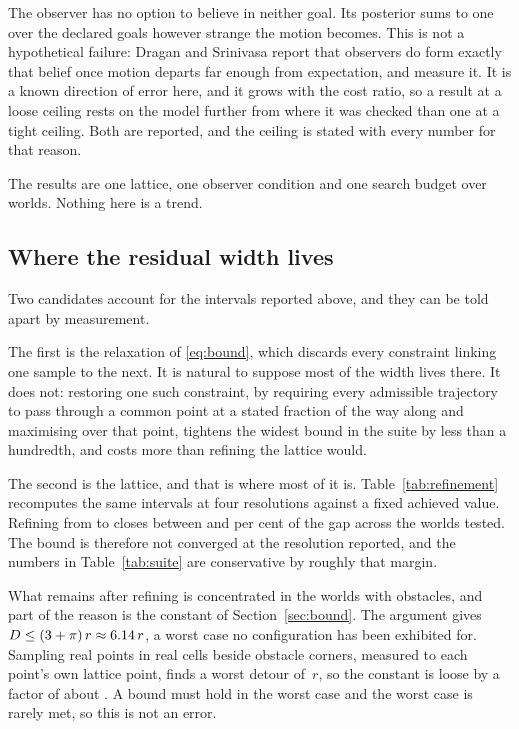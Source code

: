 \documentclass[journal]{IEEEtran}
\begin{document}
The observer has no option to believe in neither goal. Its posterior sums to
one over the declared goals however strange the motion becomes. This is not a
hypothetical failure: Dragan and Srinivasa \cite{dragan2013generating} report
that observers do form exactly that belief once motion departs far enough from
expectation, and measure it. It is a known direction of error here, and it grows with the cost
ratio, so a result at a loose ceiling rests on the model further from where it
was checked than one at a tight ceiling. Both are reported, and the ceiling is
stated with every number for that reason.

The results are one lattice, one observer condition and one search budget over
\suiteWorlds{} worlds. Nothing here is a trend.

\subsection{Where the residual width lives}

Two candidates account for the intervals reported above, and they can be told
apart by measurement.

The first is the relaxation of \eqref{eq:bound}, which discards every
constraint linking one sample to the next. It is natural to suppose most of the
width lives there. It does not: restoring one such constraint, by requiring
every admissible trajectory to pass through a common point at a stated fraction
of the way along and maximising over that point, tightens the widest bound in
the suite by less than a hundredth, and costs more than refining the lattice
would.

The second is the lattice, and that is where most of it is.
Table~\ref{tab:refinement} recomputes the same intervals at four resolutions
against a fixed achieved value. Refining from  to
 closes between  and  per
cent of the gap across the  worlds tested. The bound is
therefore not converged at the resolution reported, and the numbers in
Table~\ref{tab:suite} are conservative by roughly that margin.



What remains after refining is concentrated in the worlds with obstacles, and
part of the reason is the constant of Section~\ref{sec:bound}. The argument
gives $D \le (3 + \pi)\,r \approx 6.14{}\,r$, a worst case no
configuration has been exhibited for. Sampling real points in real cells beside
obstacle corners, measured to each point's own lattice point, finds a worst
detour of \detourMeasured{}$\,r$, so the constant is loose by a factor of about
\detourRatio{}. A bound must hold in the worst case and the worst case is
rarely met, so this is not an error.
\end{document}
